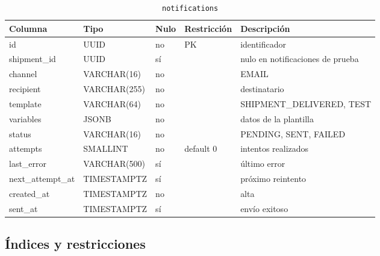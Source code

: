 \documentclass[conference]{IEEEtran}
\newcommand{\pkg}[1]{\texttt{#1}}
\begin{document}
\begin{table}[!t]
\centering
\caption{\pkg{notifications}}

\begin{tabular}{@{}L{3.2cm}L{3.2cm}L{1.1cm}L{3.4cm}L{3.9cm}@{}}
\toprule
\textbf{Columna} & \textbf{Tipo} & \textbf{Nulo} & \textbf{Restricción} & \textbf{Descripción}\\
\midrule
id & UUID & no & PK & identificador\\
shipment\_id & UUID & sí & & nulo en notificaciones de prueba\\
channel & VARCHAR(16) & no & & EMAIL\\
recipient & VARCHAR(255) & no & & destinatario\\
template & VARCHAR(64) & no & & SHIPMENT\_DELIVERED, TEST\\
variables & JSONB & no & & datos de la plantilla\\
status & VARCHAR(16) & no & & PENDING, SENT, FAILED\\
attempts & SMALLINT & no & default 0 & intentos realizados\\
last\_error & VARCHAR(500) & sí & & último error\\
next\_attempt\_at & TIMESTAMPTZ & sí & & próximo reintento\\
created\_at & TIMESTAMPTZ & no & & alta\\
sent\_at & TIMESTAMPTZ & sí & & envío exitoso\\
\bottomrule
\end{tabular}
\end{table}

\subsection{Índices y restricciones}
\end{document}
